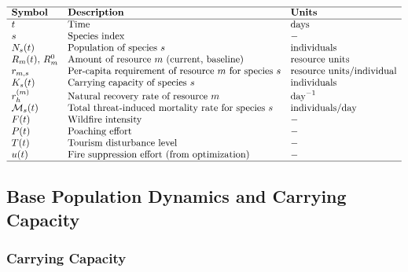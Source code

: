 \begin{table}[H]
\centering
\[
\begin{array}{lll}
\hline
\textbf{Symbol} & \textbf{Description} & \textbf{Units} \\
\hline
t & \text{Time} & \text{days} \\
s & \text{Species index} & - \\
N_s(t) & \text{Population of species } s & \text{individuals} \\
R_m(t),\,R_m^0 & \text{Amount of resource } m \text{ (current, baseline)} & \text{resource units} \\
r_{m,s} & \text{Per-capita requirement of resource } m \text{ for species } s & \text{resource units/individual} \\
K_s(t) & \text{Carrying capacity of species } s & \text{individuals} \\
r_h^{(m)} & \text{Natural recovery rate of resource } m & \text{day}^{-1} \\
\mathcal{M}_s(t) & \text{Total threat-induced mortality rate for species } s & \text{individuals/day} \\
F(t) & \text{Wildfire intensity} & - \\
P(t) & \text{Poaching effort} & - \\
T(t) & \text{Tourism disturbance level} & - \\
u(t) & \text{Fire suppression effort (from optimization)} & - \\
\hline
\end{array}
\]
\caption{General model variables}
\label{tab:variables}
\end{table}

\subsection{Base Population Dynamics and Carrying Capacity}

\subsubsection{Carrying Capacity}

